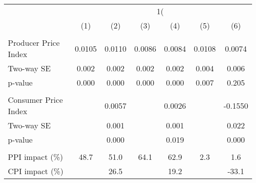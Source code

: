 {
\def\sym#1{\ifmmode^{#1}\else\(^{#1}\)\fi}
\begin{tabular}{l*{6}{c}}
\hline\hline
                    &&&\\\cmidrule(lr){2-3}\cmidrule(lr){4-5}\cmidrule(lr){6-7}
                    &         &         &         &         &         &         \\
\hline
\hline
\\ Producer Price Index&      0.0105         &      0.0110         &      0.0086         &      0.0084         &      0.0108         &      0.0074         \\
\hspace{15pt} Two-way SE&       0.002         &       0.002         &       0.002         &       0.002         &       0.004         &       0.006         \\
\hspace{25pt} p-value&       0.000         &       0.000         &       0.000         &       0.000         &       0.007         &       0.205         \\
\\ Consumer Price Index&                     &      0.0057         &                     &      0.0026         &                     &     -0.1550         \\
\hspace{15pt} Two-way SE&                     &       0.001         &                     &       0.001         &                     &       0.022         \\
\hspace{25pt} p-value&                     &       0.000         &                     &       0.019         &                     &       0.000         \\
\hline \\ PPI impact (\%)&        48.7         &        51.0         &        64.1         &        62.9         &         2.3         &         1.6         \\
CPI impact (\%)     &                     &        26.5         &                     &        19.2         &                     &       -33.1         \\

\end{tabular}}
